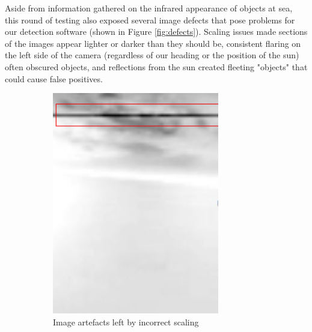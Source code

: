 Aside from information gathered on the infrared appearance of objects at sea, this round of testing also exposed several image defects that pose problems for our detection software (shown in Figure \ref{fig:defects}). Scaling issues made sections of the images appear lighter or darker than they should be, consistent flaring on the left side of the camera (regardless of our heading or the position of the sun) often obscured objects, and reflections from the sun created fleeting "objects" that could cause false positives. 

\begin{figure}[h]
\centering
\begin{subfigure}{0.3\textwidth}
 \centering
 \includegraphics[width=0.8\textwidth]{"./image/artefacts_circled"}
 \caption{Image artefacts left by incorrect scaling}
 \label{fig:defects:sub1}
\end{subfigure}
\begin{subfigure}{0.3\textwidth}
 \centering

\end{subfigure}
\end{figure}
